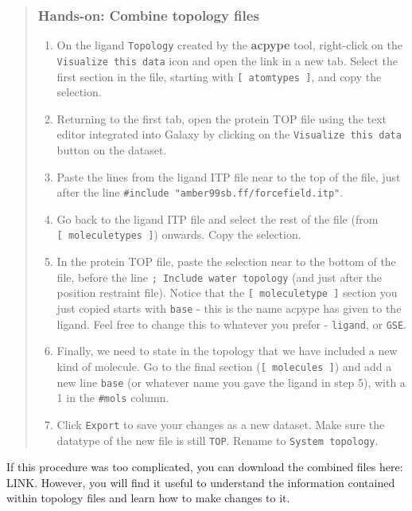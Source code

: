 \documentclass[twocolumn]{bmcart}%
\providecommand{\tightlist}{%
  \setlength{\itemsep}{0pt}\setlength{\parskip}{0pt}}
\providecommand{\tightlist}{%
  \setlength{\itemsep}{0pt}\setlength{\parskip}{0pt}}
\begin{document}
\begin{quote}
\subsubsection{Hands-on: Combine topology
files}\label{hands-on-combine-topology-files}

\begin{enumerate}
\def\labelenumi{\arabic{enumi}.}
\tightlist
\item
  On the ligand \texttt{Topology} created by the \textbf{acpype} tool,
  right-click on the \texttt{Visualize\ this\ data} icon and open the
  link in a new tab. Select the first section in the file, starting with
  \texttt{{[}\ atomtypes\ {]}}, and copy the selection.
\item
  Returning to the first tab, open the protein TOP file using the text
  editor integrated into Galaxy by clicking on the
  \texttt{Visualize\ this\ data} button on the dataset.
\item
  Paste the lines from the ligand ITP file near to the top of the file,
  just after the line \texttt{\#include\ "amber99sb.ff/forcefield.itp"}.
\item
  Go back to the ligand ITP file and select the rest of the file (from
  \texttt{{[}\ moleculetypes\ {]}}) onwards. Copy the selection.
\item
  In the protein TOP file, paste the selection near to the bottom of the
  file, before the line \texttt{;\ Include\ water\ topology} (and just
  after the position restraint file). Notice that the
  \texttt{{[}\ moleculetype\ {]}} section you just copied starts with
  \texttt{base} - this is the name acpype has given to the ligand. Feel
  free to change this to whatever you prefer - \texttt{ligand}, or
  \texttt{GSE}.
\item
  Finally, we need to state in the topology that we have included a new
  kind of molecule. Go to the final section
  (\texttt{{[}\ molecules\ {]}}) and add a new line \texttt{base} (or
  whatever name you gave the ligand in step 5), with a 1 in the
  \texttt{\#mols} column.
\item
  Click \texttt{Export} to save your changes as a new dataset. Make sure
  the datatype of the new file is still \texttt{TOP}. Rename to
  \texttt{System\ topology}.
\end{enumerate}
\end{quote}

If this procedure was too complicated, you can download the combined
files here: LINK. However, you will find it useful to understand the
information contained within topology files and learn how to make
changes to it.
\end{document}

